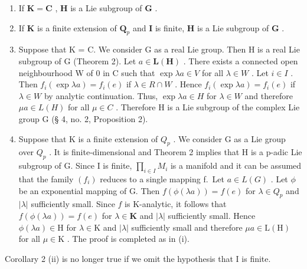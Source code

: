 \begin{enumerate}
\def\labelenumi{(\roman{enumi})}
\item
  If \(\mathbf{K} = \mathbf{C}\) , \(\mathbf{H}\) is a Lie subgroup of \(\mathbf{G}\) .
\item
  If \(\mathbf{K}\) is a finite extension of \(\mathbf{Q}_p\) and \(\mathbf{I}\) is finite, \(\mathbf{H}\) is a Lie subgroup of \(\mathbf{G}\) .
\item
  Suppose that K = C. We consider G as a real Lie group. Then H is a real Lie subgroup of G (Theorem 2). Let \(a \in \mathbf{L}(\mathbf{H})\) . There exists a connected open neighbourhood W of 0 in C such that \(\exp \lambda a \in V\) for all \(\lambda \in W\) . Let \(i \in I\) . Then \(f_i(\exp \lambda a) = f_i(e)\) if \(\lambda \in R \cap W\) . Hence \(f_i(\exp \lambda a) = f_i(e)\) if \(\lambda \in W\) by analytic continuation. Thus, \(\exp \lambda a \in H\) for \(\lambda \in W\) and therefore \(\mu a \in L(H)\) for all \(\mu \in C\) . Therefore H is a Lie subgroup of the complex Lie group G (§ 4, no. 2, Proposition 2).
\item
  Suppose that K is a finite extension of \(Q_{p}\) . We consider G as a Lie group over \(Q_{p}\) . It is finite-dimensional and Theorem 2 implies that H is a p-adic Lie subgroup of G. Since I is finite, \(\prod_{i\in I} M_{i}\) is a manifold and it can be assumed that the family \((f_{i})\) reduces to a single mapping f.~Let \(a \in L(G)\) . Let \(\phi\) be an exponential mapping of G. Then \(f(\phi(\lambda a)) = f(e)\) for \(\lambda \in Q_{p}\) and \(|\lambda|\) sufficiently small. Since \(f\) is K-analytic, it follows that \(f(\phi (\lambda a)) = f(e)\) for \(\lambda \in \mathbf{K}\) and \(|\lambda|\) sufficiently small. Hence \(\phi (\lambda a) \in \mathrm{H}\) for \(\lambda \in \mathrm{K}\) and \(|\lambda|\) sufficiently small and therefore \(\mu a \in \mathrm{L(H)}\) for all \(\mu \in \mathrm{K}\) . The proof is completed as in (i).
\end{enumerate}

Corollary 2 (ii) is no longer true if we omit the hypothesis that I is finite.

